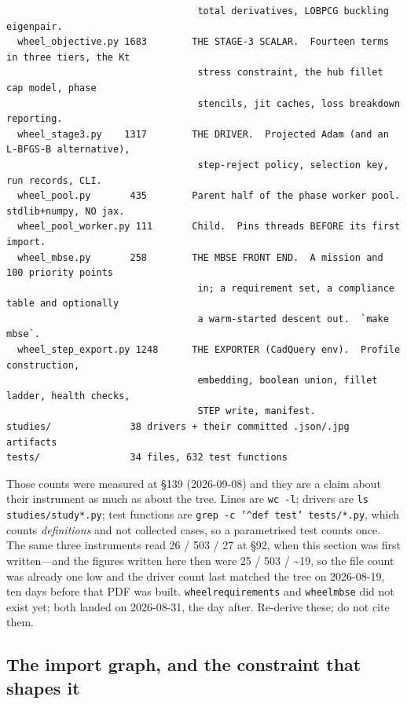 \documentclass[11pt,a4paper]{article}
\DeclareRobustCommand{\code}[1]{%
  \texttt{\small\def\_{\textunderscore\discretionary{}{}{}}#1}}
\begin{document}
\begin{lstlisting}
                                  total derivatives, LOBPCG buckling eigenpair.
  wheel_objective.py 1683        THE STAGE-3 SCALAR.  Fourteen terms in three tiers, the Kt
                                  stress constraint, the hub fillet cap model, phase
                                  stencils, jit caches, loss breakdown reporting.
  wheel_stage3.py    1317        THE DRIVER.  Projected Adam (and an L-BFGS-B alternative),
                                  step-reject policy, selection key, run records, CLI.
  wheel_pool.py       435        Parent half of the phase worker pool.  stdlib+numpy, NO jax.
  wheel_pool_worker.py 111       Child.  Pins threads BEFORE its first import.
  wheel_mbse.py       258        THE MBSE FRONT END.  A mission and 100 priority points
                                  in; a requirement set, a compliance table and optionally
                                  a warm-started descent out.  `make mbse`.
  wheel_step_export.py 1248      THE EXPORTER (CadQuery env).  Profile construction,
                                  embedding, boolean union, fillet ladder, health checks,
                                  STEP write, manifest.
studies/              38 drivers + their committed .json/.jpg artifacts
tests/                34 files, 632 test functions
\end{lstlisting}

Those counts were measured at \S139 (2026-09-08) and they are a claim about their
instrument as much as about the tree. Lines are \code{wc -l}; drivers are
\code{ls studies/study\_*.py}; test functions are
\code{grep -c '\textasciicircum{}def test\_' tests/*.py}, which counts \emph{definitions}
and not collected cases, so a parametrised test counts once. The same three instruments
read 26 / 503 / 27 at \S92, when this section was first written---and the figures written
here then were 25 / 503 / \textasciitilde{}19, so the file count was already one low and
the driver count last matched the tree on 2026-08-19, ten days before that PDF was built.
\code{wheel\_requirements} and \code{wheel\_mbse} did not exist yet; both landed on
2026-08-31, the day after. Re-derive these; do not cite them.

\subsection{The import graph, and the constraint that shapes it}
\end{document}
